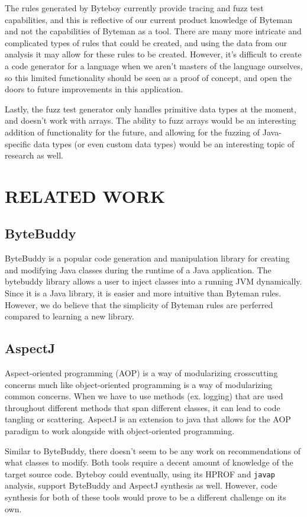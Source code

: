 \documentclass[letterpaper,twocolumn,10pt]{article}
\begin{document}
The rules generated by Byteboy currently provide tracing and fuzz test capabilities, and this is reflective of our current product knowledge of Byteman and not the capabilities of Byteman as a tool. There are many more intricate and complicated types of rules that could be created, and using the data from our analysis it may allow for these rules to be created. However, it's difficult to create a code generator for a language when we aren't masters of the language ourselves, so this limited functionality should be seen as a proof of concept, and open the doors to future improvements in this application.

Lastly, the fuzz test generator only handles primitive data types at the moment, and doesn't work with arrays. The ability to fuzz arrays would be an interesting addition of functionality for the future, and allowing for the fuzzing of Java-specific data types (or even custom data types) would be an interesting topic of research as well.

\section{RELATED WORK}

\subsection{ByteBuddy}
ByteBuddy is a popular code generation and manipulation library for creating and modifying Java classes during the runtime of a Java application\cite{bytebuddy}. The bytebuddy library allows a user to inject classes into a running JVM dynamically. Since it is a Java library, it is easier and more intuitive than Byteman rules. However, we do believe that the simplicity of Byteman rules are perferred compared to learning a new library.

\subsection{AspectJ}
Aspect-oriented programming (AOP) is a way of modularizing crosscutting concerns much like object-oriented programming is a way of modularizing common concerns\cite{aspectj}. When we have to use methods (ex. logging) that are used throughout different methods that span different classes, it can lead to code tangling or scattering. AspectJ is an extension to java that allows for the AOP paradigm to work alongside with object-oriented programming.

Similar to ByteBuddy, there doesn't seem to be any work on recommendations of what classes to modify. Both tools require a decent amount of knowledge of the target source code. Byteboy could eventually, using its HPROF and {\tt javap} analysis, support ByteBuddy and AspectJ synthesis as well. However, code synthesis for both of these tools would prove to be a different challenge on its own.
\end{document}
